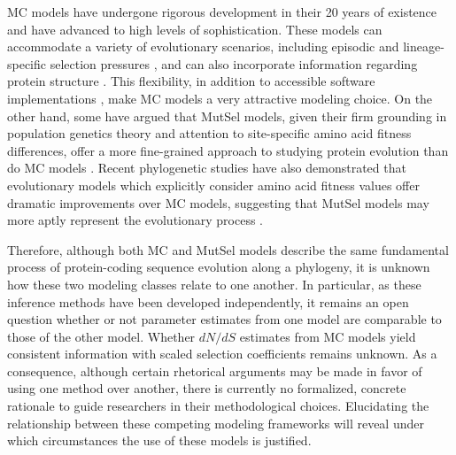 \documentclass{pnastwo}
\begin{document}
\begin{article}
MC models have undergone rigorous development in their 20 years of existence and have advanced to high levels of sophistication. These models can accommodate a variety of evolutionary scenarios, including episodic \cite{KosakovskyPondetal2011,MEME} and lineage-specific selection pressures \cite{YangNielsen2002,Zhangetal2005,KosakovskyPondFrost2005a}, and can also incorporate information regarding protein structure \cite{Robinsonetal2003,Scherreretal2012,MeyerWilke2012}. This flexibility, in addition to accessible software implementations \cite{KosakovskyPondetal2005,Yang2007,Delport2010}, make MC models a very attractive modeling choice. On the other hand, some have argued that MutSel models, given their firm grounding in population genetics theory and attention to site-specific amino acid fitness differences, offer a more fine-grained approach to studying protein evolution than do MC models \cite{HalpernBruno1998,Rodrigueetal2010,Tamurietal2012,Thorne2012}. Recent phylogenetic studies have also demonstrated that evolutionary models which explicitly consider amino acid fitness values offer dramatic improvements over MC models, suggesting that MutSel models may more aptly represent the evolutionary process \cite{Bloom2014a, Bloom2014b}. 

Therefore, although both MC and MutSel models describe the same fundamental process of protein-coding sequence evolution along a phylogeny, it is unknown how these two modeling classes relate to one another. In particular, as these inference methods have been developed independently, it remains an open question whether or not parameter estimates from one model are comparable to those of the other model. Whether $dN/dS$ estimates from MC models yield consistent information with scaled selection coefficients remains unknown. As a consequence, although certain rhetorical arguments may be made in favor of using one method over another, there is currently no formalized, concrete rationale to guide researchers in their methodological choices. Elucidating the relationship between these competing modeling frameworks will reveal under which circumstances the use of these models is justified.



\end{article}
\end{document}
